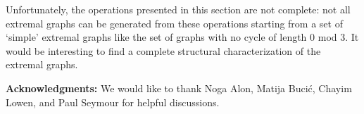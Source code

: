 \documentclass{amsart}
\theoremstyle{definition}
\theoremstyle{remark}
\begin{document}
Unfortunately, the operations presented in this section are not complete: not all extremal graphs can be generated from these operations starting from a set of `simple' extremal graphs like the set of graphs with no cycle of length $0$ mod $3$. It would be interesting to find a complete structural characterization of the extremal graphs. 

\textbf{Acknowledgments:} We would like to thank Noga Alon, Matija Bucić, Chayim Lowen, and Paul Seymour for helpful discussions.



\end{document}

